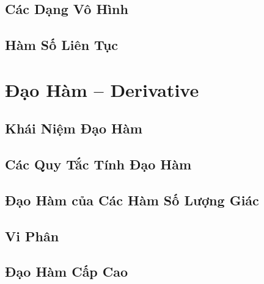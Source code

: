 \documentclass[oneside]{book}
\numberwithin{equation}{section}
\begin{document}

\section{Các Dạng Vô Hình}


\section{Hàm Số Liên Tục}


\chapter{Đạo Hàm -- Derivative}

\section{Khái Niệm Đạo Hàm}


\section{Các Quy Tắc Tính Đạo Hàm}


\section{Đạo Hàm của Các Hàm Số Lượng Giác}


\section{Vi Phân}


\section{Đạo Hàm Cấp Cao}
\end{document}
